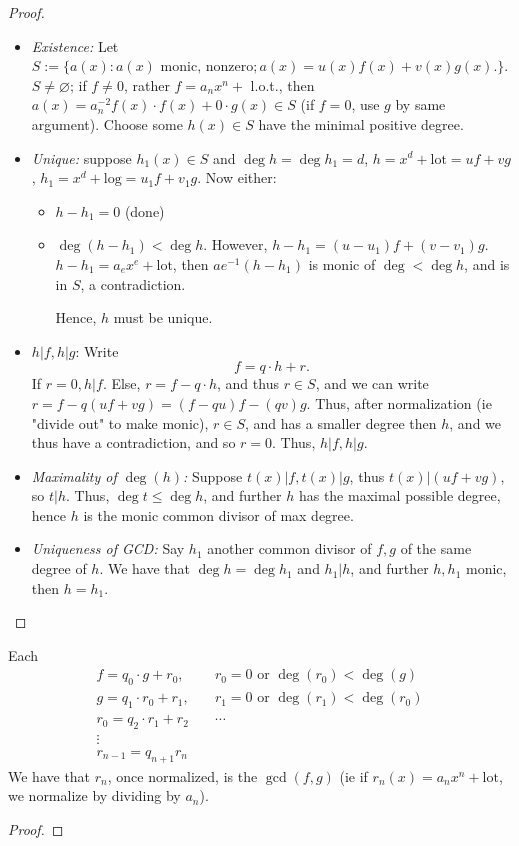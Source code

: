 \documentclass[12pt,oneside]{article}
\begin{document}
\begin{proof}
  \begin{itemize}
    \item \textit{Existence: } Let $S := \{a(x) : a(x) \text{ monic, nonzero}; a(x) = u(x) f(x) + v(x) g(x).\}$. $S \neq \varnothing$; if $f \neq 0$, rather $f = a_n x^{n} + $ l.o.t., then $a(x) = a_{n}^{-2} f(x)\cdot f(x) + 0 \cdot g(x) \in S$ (if $f = 0$, use $g$ by same argument). Choose some $h(x) \in S$ have the minimal positive degree.
  
    \item \textit{Unique: } suppose $h_1(x) \in S$ and $\deg h = \deg h_1 = d$, $h = x^{d} + \text{lot} = uf + vg$, $h_1 = x^{d} + \text{log} = u_1f + v_1g$. Now either:
    \begin{itemize}
      \item $h- h_1 = 0$ (done)
      \item $\deg (h-h_1) < \deg h$. However, $h-h_1 = (u-u_1)f + (v-v_1) g$. $h-h_1 = a_e x^{e} + \text{lot}$, then $ae^{-1}(h-h_1)$ is monic of $\deg < \deg h$, and is in $S$, a contradiction. 
      
      Hence, $h$ must be unique.
    \end{itemize}
    \item $h|f, h|g$: Write \[f = q \cdot h + r.\] If $r = 0, h | f$. Else, $r = f - q \cdot h$, and thus $r \in S$, and we can write $r = f -q (uf + vg) = (f-qu)f - (qv)g$. Thus, after normalization (ie "divide out" to make monic), $r \in S$, and has a smaller degree then $h$, and we thus have a contradiction, and so $r = 0$. Thus, $h | f, h | g$.
    \item \textit{Maximality of $\deg (h)$:} Suppose $t(x) | f, t(x) | g$, thus $t(x) | (uf + vg)$, so $t | h$. Thus, $\deg t \leq \deg h$, and further $h$ has the maximal possible degree, hence $h$ is the monic common divisor of max degree.
    \item \textit{Uniqueness of GCD:} Say $h_1$ another common divisor of $f, g$ of the same degree of $h$. We have that $\deg {h} = \deg{h_1}$ and $h_1 | h$, and further $h, h_1$ monic, then $h = h_1$.
  \end{itemize}
\end{proof}

\begin{theorem}
  Each
  \begin{align*}
    f = q_0 \cdot g + r_0, &\quad r_0 = 0 \text{ or } \deg(r_0) < \deg (g)\\
    g = q_1 \cdot r_0 + r_1, &\quad r_1 = 0 \text{ or }\deg(r_1)<\deg(r_0)\\
    r_0 = q_2 \cdot r_1+r_2 &\quad \cdots\\
    \vdots \\
    r_{n-1} = q_{n+1}r_n&
  \end{align*}
  We have that $r_n$, once normalized, is the $\gcd(f,g)$ (ie if $r_n(x) = a_n x^{n} + \text{lot}$, we normalize by dividing by $a_n$).
\end{theorem}
\begin{proof}
\end{proof}
\end{document}
